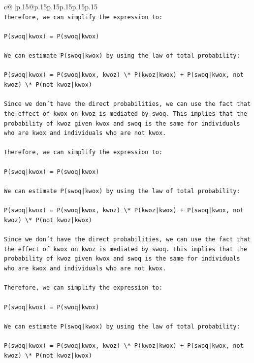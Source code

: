 \documentclass{article}
\begin{document}
{\begin{supertabular}{c@{$\;$}|p{.15\linewidth}@{}p{.15\linewidth}p{.15\linewidth}p{.15\linewidth}p{.15\linewidth}p{.15\linewidth}}
{{{\\ 
\texttt{Therefore, we can simplify the expression to:} \\
\\ 
\texttt{P(swoq|kwox) = P(swoq|kwox)} \\
\\ 
\texttt{We can estimate P(swoq|kwox) by using the law of total probability:} \\
\\ 
\texttt{P(swoq|kwox) = P(swoq|kwox, kwoz) \textbackslash{}* P(kwoz|kwox) + P(swoq|kwox, not kwoz) \textbackslash{}* P(not kwoz|kwox)} \\
\\ 
\texttt{Since we don't have the direct probabilities, we can use the fact that the effect of kwox on kwoz is mediated by swoq. This implies that the probability of kwoz given kwox and swoq is the same for individuals who are kwox and individuals who are not kwox.} \\
\\ 
\texttt{Therefore, we can simplify the expression to:} \\
\\ 
\texttt{P(swoq|kwox) = P(swoq|kwox)} \\
\\ 
\texttt{We can estimate P(swoq|kwox) by using the law of total probability:} \\
\\ 
\texttt{P(swoq|kwox) = P(swoq|kwox, kwoz) \textbackslash{}* P(kwoz|kwox) + P(swoq|kwox, not kwoz) \textbackslash{}* P(not kwoz|kwox)} \\
\\ 
\texttt{Since we don't have the direct probabilities, we can use the fact that the effect of kwox on kwoz is mediated by swoq. This implies that the probability of kwoz given kwox and swoq is the same for individuals who are kwox and individuals who are not kwox.} \\
\\ 
\texttt{Therefore, we can simplify the expression to:} \\
\\ 
\texttt{P(swoq|kwox) = P(swoq|kwox)} \\
\\ 
\texttt{We can estimate P(swoq|kwox) by using the law of total probability:} \\
\\ 
\texttt{P(swoq|kwox) = P(swoq|kwox, kwoz) \textbackslash{}* P(kwoz|kwox) + P(swoq|kwox, not kwoz) \textbackslash{}* P(not kwoz|kwox)} \\
}}}
\end{supertabular}}
\end{document}
